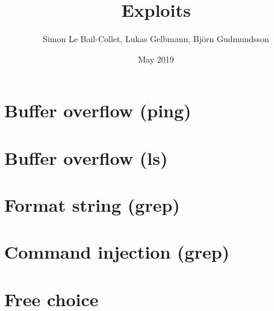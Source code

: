 \documentclass{article}
\title{Exploits}
\author{Simon Le Bail-Collet, Lukas Gelbmann, Björn Gudmundsson}
\date{May 2019}
\begin{document}
\maketitle

\section{Buffer overflow (ping)}

\section{Buffer overflow (ls)}

\section{Format string (grep)}

\section{Command injection (grep)}

\section{Free choice}
\end{document}
